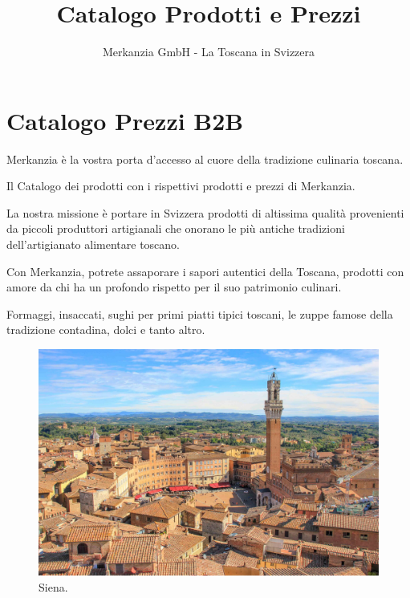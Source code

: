 \documentclass[
  beamerpaper,
  DIV=11,
  numbers=noendperiod,
  aspectratio=54]{scrreprt}
\title{Catalogo Prodotti e Prezzi}
\subtitle{Merkanzia GmbH - La Toscana in Svizzera}
\author{}
\date{November 30, 2023\\
\strut \\
\strut \\
info@merkanzia.com}
\begin{document}
\maketitle
\ifdefined\Shaded\renewenvironment{Shaded}{\begin{tcolorbox}[interior hidden, borderline west={3pt}{0pt}{shadecolor}, enhanced, sharp corners, breakable, frame hidden, boxrule=0pt]}{\end{tcolorbox}}\fi

\renewcommand{\arraystretch}{1.6}

\hypertarget{catalogo-prezzi-b2b}{%
\chapter{Catalogo Prezzi B2B}\label{catalogo-prezzi-b2b}}

Merkanzia è la vostra porta d'accesso al cuore della tradizione
culinaria toscana.

Il Catalogo dei prodotti con i rispettivi prodotti e prezzi di
Merkanzia.

La nostra missione è portare in Svizzera prodotti di altissima qualità
provenienti da piccoli produttori artigianali che onorano le più antiche
tradizioni dell'artigianato alimentare toscano.

Con Merkanzia, potrete assaporare i sapori autentici della Toscana,
prodotti con amore da chi ha un profondo rispetto per il suo patrimonio
culinari.

Formaggi, insaccati, sughi per primi piatti tipici toscani, le zuppe
famose della tradizione contadina, dolci e tanto altro.

\begin{figure}

{\centering \includegraphics{../../img/Siena-n-1-scaled.jpg}

}

\caption{Siena.}

\end{figure}
\end{document}
